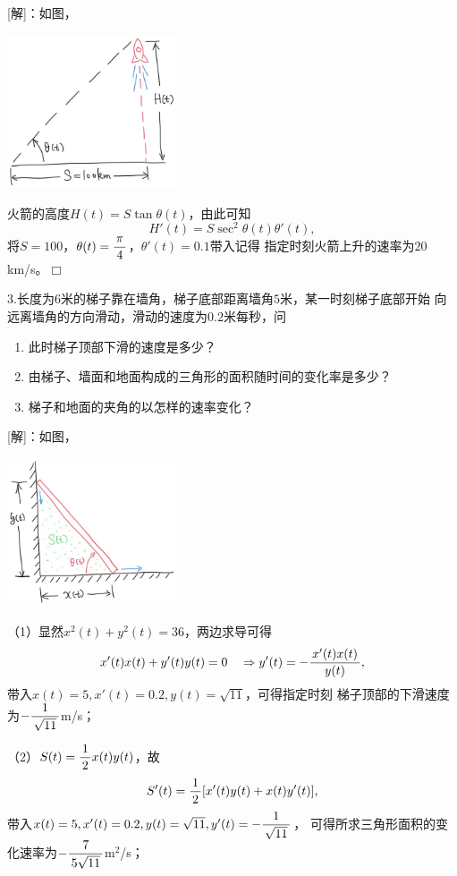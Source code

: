 [解]：如图，
\begin{center}
	\includegraphics[width=5cm]{./images/ch2/Rocket.jpg}
\end{center}
火箭的高度$H(t)=S\tan\theta(t)$，由此可知
$$H'(t)=S\sec^2\theta(t)\theta'(t),$$
将$S=100$，$\theta(t)=\displaystyle\frac{\,{\pi}\,}{\,{4}\,}$，$\theta'(t)=0.1$带入记得
指定时刻火箭上升的速率为$20$km/s。\hfill$\Box$

\bigskip

3.长度为$6$米的梯子靠在墙角，梯子底部距离墙角$5$米，某一时刻梯子底部开始
向远离墙角的方向滑动，滑动的速度为$0.2$米每秒，问
\begin{enumerate}[(1)]
  \setlength{\itemindent}{1cm}
  \item 此时梯子顶部下滑的速度是多少？
  \item 由梯子、墙面和地面构成的三角形的面积随时间的变化率是多少？
  \item 梯子和地面的夹角的以怎样的速率变化？
\end{enumerate}

[解]：如图，
\begin{center}
	\includegraphics[width=5cm]{./images/ch2/ladder.jpg}
\end{center}
（1）显然$x^2(t)+y^2(t)=36$，两边求导可得
$$x'(t)x(t)+y'(t)y(t)=0\quad
\Rightarrow y'(t)=-\displaystyle\frac{\,{x'(t)x(t)}\,}{\,{y(t)}\,},$$
带入$x(t)=5,x'(t)=0.2,y(t)=\sqrt{11}$，可得指定时刻
梯子顶部的下滑速度为$-\displaystyle\frac{\,{1}\,}{\,{\sqrt{11}}\,}$m/s；

（2）$S(t)=\displaystyle\frac{\,{1}\,}{\,{2}\,}x(t)y(t)$，故
$$S'(t)=\displaystyle\frac{\,{1}\,}{\,{2}\,}[x'(t)y(t)+x(t)y'(t)],$$
带入$x(t)=5,x'(t)=0.2,y(t)=\sqrt{11},y'(t)=-\displaystyle\frac{\,{1}\,}{\,{\sqrt{11}}\,}$，
可得所求三角形面积的变化速率为$-\displaystyle\frac{\,{7}\,}{\,{5\sqrt{11}}\,}$m$^2$/s；

